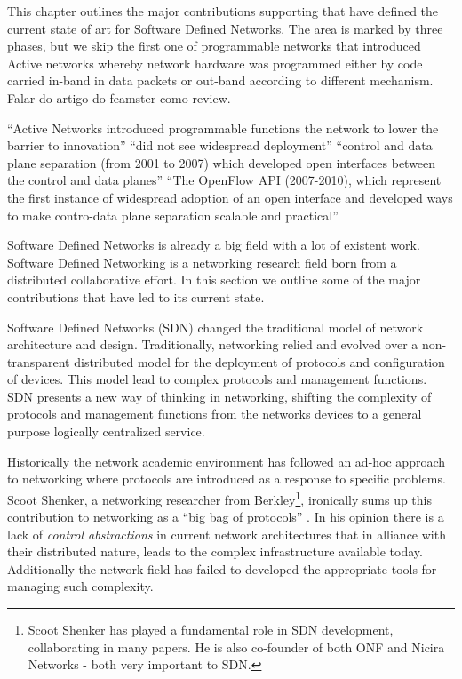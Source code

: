 


This chapter outlines the major contributions supporting that have defined the current state of art for Software Defined Networks. 
The area is marked by three phases, but we skip the first one of programmable networks that introduced Active networks whereby network hardware was programmed either by code carried in-band in data packets or out-band according to different mechanism. 
Falar do artigo do feamster como review. 


``Active Networks introduced programmable functions the network to lower the barrier to innovation'' ``did not see widespread deployment''
``control and data plane separation (from 2001 to 2007) which developed open interfaces between the control and data planes'' 
``The OpenFlow API (2007-2010), which represent the first instance of widespread adoption of an open interface and developed ways to make contro-data plane separation scalable and practical'' 


Software Defined Networks is already a big field with a lot of existent work. 
Software Defined Networking is a networking research field born from a  distributed
collaborative effort. In this section we outline some of the major contributions that have led to its current state. 






Software Defined Networks (SDN) changed the traditional model of network architecture and design. 
Traditionally, networking  relied and evolved over a non-transparent distributed model for
the deployment  of  protocols and configuration of devices. 
This model lead to complex protocols and management functions. 
SDN presents a new way of thinking in networking, shifting the complexity of protocols and management functions from  the  networks devices to a general purpose logically centralized service. 

Historically  the network academic environment has followed an  ad-hoc approach to networking where protocols are introduced as a response to specific problems. 
Scoot Shenker, a networking researcher from Berkley\footnote{Scoot Shenker has played a fundamental role in SDN development, collaborating in many papers. He is also co-founder of both ONF \cite{onf} and Nicira Networks - both very important to SDN.}, ironically sums up  this contribution to networking as a ``big bag of protocols'' \cite{Shenker:2011ys}. 
In his opinion there is a lack of \emph{control abstractions} in current network architectures that in alliance  with  their  distributed nature, leads to the  complex infrastructure available today. 
Additionally the network field has failed to developed the appropriate tools for managing such complexity. 


